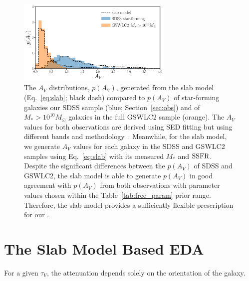 \begin{figure}
    \begin{center}
        \includegraphics[width=0.66\textwidth]{figs/slab_model.pdf} 
        \caption{\label{fig:av_dist}
        The $A_V$ distributions, $p(A_V)$, generated from the slab model (Eq.~\ref{eq:slab};
        black dash) compared to $p(A_V)$ of star-forming galaxies our SDSS
        sample (blue; Section~\ref{sec:obs}) and of $M_* > 10^{10}M_\odot$
        galaxies in the full \cite{salim2018} GSWLC2 sample (orange). 
        The $A_V$ values for both observations are derived using SED
        fitting but using different bands and methodology~\citep{brinchmann2004, salim2018}. 
        Meanwhile, for the slab model, we generate $A_V$ values for each galaxy
        in the SDSS and GSWLC2 samples using Eq.~\ref{eq:slab} with its
        measured $M_*$ and ${\rm SSFR}$. 
        Despite the significant differences between the $p(A_V)$ of SDSS and
        GSWLC2, the slab model is able to generate $p(A_V)$ in good agreement
        with $p(A_V)$ from both observations with parameter values chosen within the
        Table~\ref{tab:free_param} prior range. 
        Therefore, the slab model provides a sufficiently flexible prescription
        for our \eda.
        }
    \end{center}
\end{figure}


\section{The Slab Model Based EDA}  \label{sec:slab} 
For a given $\tau_V$, the attenuation depends solely on the orientation of the galaxy. 

